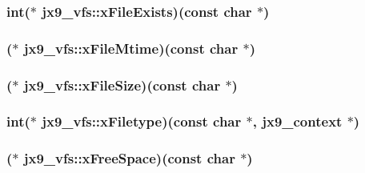 \hypertarget{structjx9__vfs_a387bdd567e04be4df82b4a8e99db8a35}{
\subsubsection[{x\-File\-Exists}]{\setlength{\rightskip}{0pt plus 5cm}int($\ast$ jx9\-\_\-vfs\-::x\-File\-Exists)(const char $\ast$)}}\label{da/d75/structjx9__vfs_a387bdd567e04be4df82b4a8e99db8a35}
\hypertarget{structjx9__vfs_abbbcc97776f595af157d9a3592fb52f5}{
\subsubsection[{x\-File\-Mtime}]{($\ast$ jx9\-\_\-vfs\-::x\-File\-Mtime)(const char $\ast$)}}\label{da/d75/structjx9__vfs_abbbcc97776f595af157d9a3592fb52f5}
\hypertarget{structjx9__vfs_a258ad7701306ef56e70c2b4812d8a5a1}{
\subsubsection[{x\-File\-Size}]{($\ast$ jx9\-\_\-vfs\-::x\-File\-Size)(const char $\ast$)}}\label{da/d75/structjx9__vfs_a258ad7701306ef56e70c2b4812d8a5a1}
\hypertarget{structjx9__vfs_a60ffb0b1c8bb9107e584cc9f9e98af2a}{
\subsubsection[{x\-Filetype}]{\setlength{\rightskip}{0pt plus 5cm}int($\ast$ jx9\-\_\-vfs\-::x\-Filetype)(const char $\ast$, {\bf jx9\-\_\-context} $\ast$)}}\label{da/d75/structjx9__vfs_a60ffb0b1c8bb9107e584cc9f9e98af2a}
\hypertarget{structjx9__vfs_af34b15851378618509bb6c30abed958a}{
\subsubsection[{x\-Free\-Space}]{($\ast$ jx9\-\_\-vfs\-::x\-Free\-Space)(const char $\ast$)}}\label{da/d75/structjx9__vfs_af34b15851378618509bb6c30abed958a}
